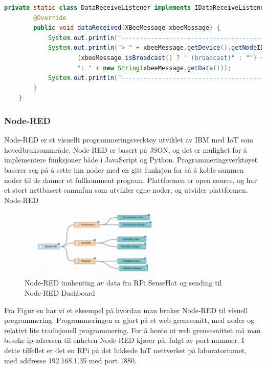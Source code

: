 \documentclass{article}
\begin{document}
\begin{lstlisting}[language=Java, caption=Java eksempel]
    private static class DataReceiveListener implements IDataReceiveListener {
        @Override
        public void dataReceived(XBeeMessage xbeeMessage) {
            System.out.println("------------------------------------------------------------------");
            System.out.println("> " + xbeeMessage.getDevice().getNodeID() +
                    (xbeeMessage.isBroadcast() ? " (broadcast)" : "") +
                    ": " + new String(xbeeMessage.getData()));
            System.out.println("------------------------------------------------------------------");
        }
    }
 \end{lstlisting} 

\subsubsection{Node-RED}
Node-RED er et visuellt programmeringsverktøy utviklet av IBM med IoT som hovedbruksommråde. Node-RED er basert på JSON, og det er mulighet for å implementere funksjoner både i JavaScript og Python. Programmeringsverktøyet baserer seg på å sette inn noder med en gitt funksjon for så å koble sammen noder til de danner et fullkomment program. Plattformen er open source, og har et stort nettbasert sammfun som utvikler egne noder, og utvider plattformen. Node-RED 

\begin{figure}[!ht]
  \centering
      \includegraphics[width=0.6\textwidth]{NodeRedSenseFlow1}
  \caption {Node-RED innhenting av data fra RPi SenseHat og sending til Node-RED Dashboard}
\end{figure}

Fra Figur en har vi et eksempel på hvordan man bruker Node-RED til visuell programmering. Programmeringen er gjort på et web grensesnitt, med noder og relativt lite tradisjonell programmering. For å hente ut web grensesnittet må man besøke ip-adressen til enheten Node-RED kjører på, fulgt av port nummer. I dette tilfellet er det en RPi på det lukkede IoT nettverket på laboratoriumet, med addresse 192.168.1.35 med port 1880.
\end{document}
